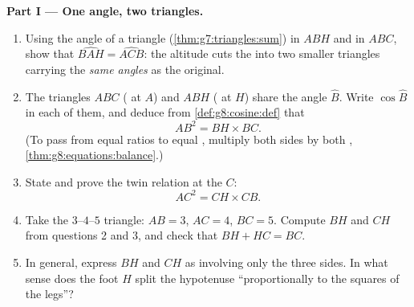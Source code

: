 \begin{problem}[{Weekend problem --- the altitude of a right
triangle: $AB^2 = BH \times BC$, $AH^2 = BH \times HC$, a second
proof of Pythagoras, and a machine for constructing square roots}]
\medskip
\noindent\textbf{Part I --- One angle, two triangles.}
\begin{enumerate}
  \item Using the angle  of a triangle
        (\cref{thm:g7:triangles:sum}) in $ABH$ and in $ABC$, show
        that $\widehat{BAH} = \widehat{ACB}$: the altitude cuts
        the  into two smaller triangles carrying
        the \emph{same angles} as the original.
  \item The triangles $ABC$ ( at $A$) and $ABH$
        ( at $H$) share the angle $\widehat B$. Write
        $\cos\widehat B$ in each of them, and deduce from
        \cref{def:g8:cosine:def} that
        \[
        AB^2 = BH \times BC .
        \]
        (To pass from equal ratios to equal , multiply
        both sides by both ,
        \cref{thm:g8:equations:balance}.)
  \item State and prove the twin relation at the  $C$:
        \[
        AC^2 = CH \times CB .
        \]
  \item Take the $3$--$4$--$5$ triangle: $AB = 3$, $AC = 4$,
        $BC = 5$. Compute $BH$ and $CH$ from questions 2 and 3,
        and check that $BH + HC = BC$.
  \item In general, express $BH$ and $CH$ as  involving
        only the three sides. In what sense does the foot $H$
        split the hypotenuse ``proportionally to the squares of
        the legs''?
\end{enumerate}


\end{problem}
